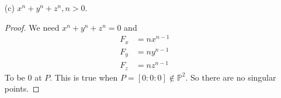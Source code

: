 \documentclass{article}
\begin{document}
\begin{itemize}
\begin{proof}
\begin{itemize}
                        \item Case 2: $F_{y} = 0 \implies z = 0$. Then
                            \begin{equation*}
                                F_{x}(x, y, 0) = -3x^{2}
                            \end{equation*}
                        So $x = 0$. Now plug this into $F_{z}$ to get:
                            \begin{equation*}
                                F_{z}(0, y, 0) = y^{2}
                            \end{equation*}
                        So $y = 0$, which is impossible.

                        \item $z = y = 0$. This is impossible since $F_{x}(x, 0, 0) = 0$ implies that $x = 0$.
                    \end{itemize}
                None of the cases work out, so there are no singular points.
            \end{proof}

        \item [(c)] $x^{n} + y^{n} + z^{n}, n > 0$. 
            \begin{proof}
                We need $x^{n} + y^{n} + z^{n} = 0$ and 
                    \begin{align*}
                        F_{x} &= nx^{n - 1} \\
                        F_{y} &= ny^{n - 1} \\
                        F_{z} &= nz^{n - 1}   
                    \end{align*}
                To be $0$ at $P$. This is true when $P = [0 : 0 : 0] \notin \mathbb{ P}^{2}$. So there are no singular points.
            \end{proof}
    \end{itemize}

\newpage
\end{document}
